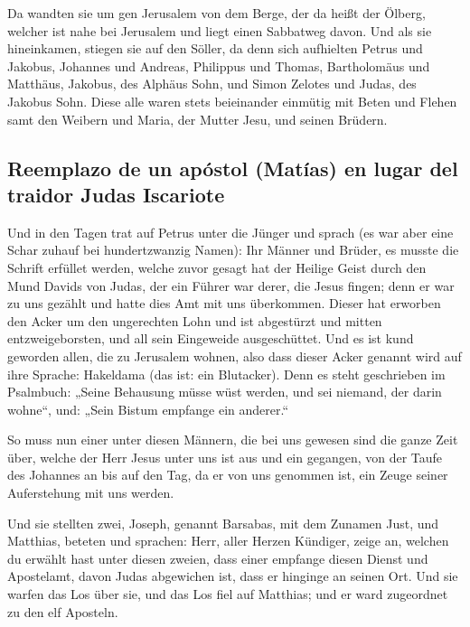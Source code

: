  Da wandten sie um gen Jerusalem von dem Berge, der da
heißt der Ölberg, welcher ist nahe bei Jerusalem und liegt einen
Sabbatweg davon.  Und als sie hineinkamen, stiegen sie
auf den Söller, da denn sich aufhielten Petrus und Jakobus, Johannes und
Andreas, Philippus und Thomas, Bartholomäus und Matthäus, Jakobus, des
Alphäus Sohn, und Simon Zelotes und Judas, des Jakobus Sohn.
 Diese alle waren stets beieinander einmütig mit Beten
und Flehen samt den Weibern und Maria, der Mutter Jesu, und seinen
Brüdern.

\hypertarget{reemplazo-de-un-apuxf3stol-matuxedas-en-lugar-del-traidor-judas-iscariote}{%
\subsection{Reemplazo de un apóstol (Matías) en lugar del traidor Judas
Iscariote}\label{reemplazo-de-un-apuxf3stol-matuxedas-en-lugar-del-traidor-judas-iscariote}}

 Und in den Tagen trat auf Petrus unter die Jünger und
sprach (es war aber eine Schar zuhauf bei hundertzwanzig Namen):
 Ihr Männer und Brüder, es musste die Schrift erfüllet
werden, welche zuvor gesagt hat der Heilige Geist durch den Mund Davids
von Judas, der ein Führer war derer, die Jesus fingen; 
denn er war zu uns gezählt und hatte dies Amt mit uns überkommen.
 Dieser hat erworben den Acker um den ungerechten Lohn
und ist abgestürzt und mitten entzweigeborsten, und all sein Eingeweide
ausgeschüttet.  Und es ist kund geworden allen, die zu
Jerusalem wohnen, also dass dieser Acker genannt wird auf ihre Sprache:
Hakeldama (das ist: ein Blutacker).  Denn es steht
geschrieben im Psalmbuch: „Seine Behausung müsse wüst werden, und sei
niemand, der darin wohne``, und: „Sein Bistum empfange ein anderer.``

 So muss nun einer unter diesen Männern, die bei uns
gewesen sind die ganze Zeit über, welche der Herr Jesus unter uns ist
aus und ein gegangen,  von der Taufe des Johannes an bis
auf den Tag, da er von uns genommen ist, ein Zeuge seiner Auferstehung
mit uns werden.

 Und sie stellten zwei, Joseph, genannt Barsabas, mit dem
Zunamen Just, und Matthias,  beteten und sprachen: Herr,
aller Herzen Kündiger, zeige an, welchen du erwählt hast unter diesen
zweien,  dass einer empfange diesen Dienst und
Apostelamt, davon Judas abgewichen ist, dass er hinginge an seinen Ort.
 Und sie warfen das Los über sie, und das Los fiel auf
Matthias; und er ward zugeordnet zu den elf Aposteln.

